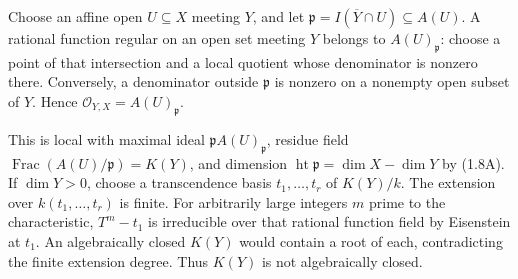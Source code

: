 Choose an affine open $U\subseteq X$ meeting $Y$, and let $\mathfrak p=I(\overline Y\cap U)\subseteq A(U)$. A rational function regular on an open set meeting $Y$ belongs to $A(U)_{\mathfrak p}$: choose a point of that intersection and a local quotient whose denominator is nonzero there. Conversely, a denominator outside $\mathfrak p$ is nonzero on a nonempty open subset of $Y$. Hence $\mathcal O_{Y,X}=A(U)_{\mathfrak p}$.

This is local with maximal ideal $\mathfrak p A(U)_{\mathfrak p}$, residue field $\operatorname{Frac}(A(U)/\mathfrak p)=K(Y)$, and dimension $\operatorname{ht}\mathfrak p=\dim X-\dim Y$ by (1.8A). If $\dim Y>0$, choose a transcendence basis $t_1,\ldots,t_r$ of $K(Y)/k$. The extension over $k(t_1,\ldots,t_r)$ is finite. For arbitrarily large integers $m$ prime to the characteristic, $T^m-t_1$ is irreducible over that rational function field by Eisenstein at $t_1$. An algebraically closed $K(Y)$ would contain a root of each, contradicting the finite extension degree. Thus $K(Y)$ is not algebraically closed.
